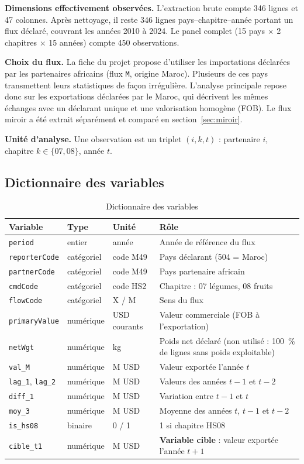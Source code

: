 \documentclass[11pt,a4paper]{article}
\begin{document}
\textbf{Dimensions effectivement observées.} L'extraction brute compte 346 lignes et 47 colonnes. Après nettoyage, il reste 346 lignes pays--chapitre--année portant un flux déclaré, couvrant les années 2010 à 2024. Le panel complet (15 pays $\times$ 2 chapitres $\times$ 15 années) compte 450 observations.

\textbf{Choix du flux.} La fiche du projet propose d'utiliser les importations déclarées par les partenaires africains (flux \texttt{M}, origine Maroc). Plusieurs de ces pays transmettent leurs statistiques de façon irrégulière. L'analyse principale repose donc sur les exportations déclarées par le Maroc, qui décrivent les mêmes échanges avec un déclarant unique et une valorisation homogène (FOB). Le flux miroir a été extrait séparément et comparé en section~\ref{sec:miroir}.

\textbf{Unité d'analyse.} Une observation est un triplet $(i,k,t)$ : partenaire $i$, chapitre $k \in \{07, 08\}$, année $t$.

\subsection{Dictionnaire des variables}
\begin{table}[H]\centering\small
\caption{Dictionnaire des variables}\label{tab:variables}
\begin{tabular}{lllp{6.4cm}}\toprule
Variable & Type & Unité & Rôle \\ \midrule
\texttt{period} & entier & année & Année de référence du flux \\
\texttt{reporterCode} & catégoriel & code M49 & Pays déclarant (504 = Maroc) \\
\texttt{partnerCode} & catégoriel & code M49 & Pays partenaire africain \\
\texttt{cmdCode} & catégoriel & code HS2 & Chapitre : 07 légumes, 08 fruits \\
\texttt{flowCode} & catégoriel & X / M & Sens du flux \\
\texttt{primaryValue} & numérique & USD courants & Valeur commerciale (FOB à l'exportation) \\
\texttt{netWgt} & numérique & kg & Poids net déclaré (non utilisé : 100~\% de lignes sans poids exploitable) \\
\texttt{val\_M} & numérique & M USD & Valeur exportée l'année $t$ \\
\texttt{lag\_1}, \texttt{lag\_2} & numérique & M USD & Valeurs des années $t-1$ et $t-2$ \\
\texttt{diff\_1} & numérique & M USD & Variation entre $t-1$ et $t$ \\
\texttt{moy\_3} & numérique & M USD & Moyenne des années $t$, $t-1$ et $t-2$ \\
\texttt{is\_hs08} & binaire & 0 / 1 & 1 si chapitre HS08 \\
\texttt{cible\_t1} & numérique & M USD & \textbf{Variable cible} : valeur exportée l'année $t+1$ \\
\bottomrule\end{tabular}
\end{table}
\end{document}
